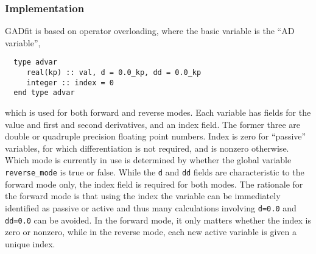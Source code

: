 \documentclass{article}
\begin{document}
\subsubsection{Implementation}

GADfit is based on operator overloading, where the basic variable is the ``AD variable'',
\begin{verbatim}
  type advar
     real(kp) :: val, d = 0.0_kp, dd = 0.0_kp
     integer :: index = 0
  end type advar
\end{verbatim}
which is used for both forward and reverse modes. Each variable has fields for the value and first and second derivatives, and an index field. The former three are double or quadruple precision floating point numbers. Index is zero for ``passive'' variables, for which differentiation is not required, and is nonzero otherwise. Which mode is currently in use is determined by whether the global variable \verb+reverse_mode+ is true or false. While the \texttt{d} and \texttt{dd} fields are characteristic to the forward mode only, the index field is required for both modes. The rationale for the forward mode is that using the index the variable can be immediately identified as passive or active and thus many calculations involving \texttt{d=0.0} and \texttt{dd=0.0} can be avoided. In the forward mode, it only matters whether the index is zero or nonzero, while in the reverse mode, each new active variable is given a unique index.
\end{document}
